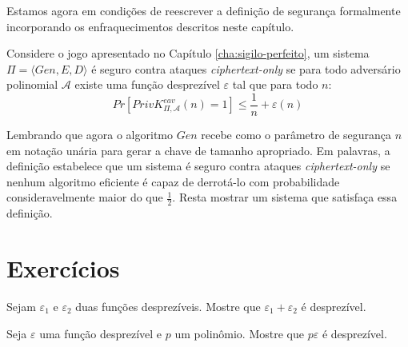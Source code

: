 Estamos agora em condições de reescrever a definição de segurança formalmente incorporando os enfraquecimentos descritos neste capítulo.

\begin{definition}
  Considere o jogo apresentado no Capítulo \ref{cha:sigilo-perfeito}, um sistema $\Pi = \langle Gen, E, D \rangle$ é seguro contra ataques {\em ciphertext-only} se para todo adversário polinomial $\mathcal{A}$ existe uma função desprezível $\varepsilon$ tal que para todo $n$:
\begin{displaymath}
  Pr[PrivK^{eav}_{\Pi, \mathcal{A}}(n) = 1] \leq \frac{1}{n} + \varepsilon(n)
\end{displaymath}
\end{definition}

Lembrando que agora o algoritmo $Gen$ recebe como o parâmetro de segurança $n$ em notação unária para gerar a chave de tamanho apropriado.
Em palavras, a definição estabelece que um sistema é seguro contra ataques {\em ciphertext-only} se nenhum algoritmo eficiente é capaz de derrotá-lo com probabilidade consideravelmente maior do que $\frac{1}{2}$.
Resta mostrar um sistema que satisfaça essa definição.


\section{Exercícios}
\label{sec:exercicios}


\begin{exercicio}
  Sejam $\varepsilon_1$ e $\varepsilon_2$ duas funções desprezíveis. 
  Mostre que $\varepsilon_1 + \varepsilon_2$ é desprezível.
\end{exercicio}

\begin{exercicio}
  Seja $\varepsilon$ uma função desprezível e $p$ um polinômio. 
  Mostre que $p\varepsilon$ é desprezível.
\end{exercicio}